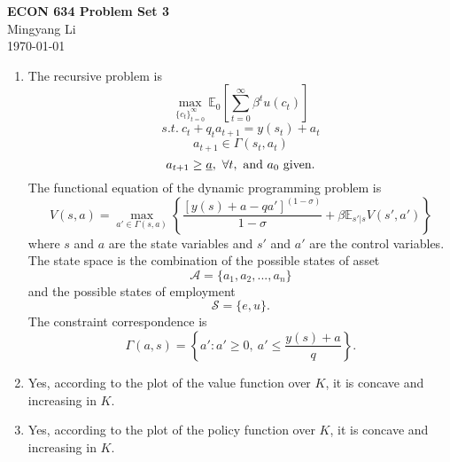 \documentclass[12pt]{article}
\begin{document}
\thispagestyle{empty}
\begin{center}
\Large{\textbf{ECON 634 Problem Set 3}}\\[3mm]
\large{{Mingyang Li}}\\[1mm]
\today
\end{center}

\begin{enumerate}
\item The recursive problem is 
$$\max_{\{c_t\}_{t=0}^\infty}\mathbb{E}_0\left[\sum_{t=0}^\infty\beta^t u(c_t)\right]$$
$$s.t.\ c_t+q_ta_{t+1}=y(s_t)+a_t$$
$$a_{t+1}\in\Gamma(s_t,a_t)$$
$$a_{t+1}\geq\underbar{$a$},\ \forall t,\ \text{and}\ a_0\ \text{given.}$$
The functional equation of the dynamic programming problem is
$$V(s,a)=\max_{a'\in\Gamma(s,a)} \left\{\frac{[y(s)+a-qa']^{(1-\sigma)}}{1-\sigma}+\beta\mathbb{E}_{s'|s}V(s',a')\right\}$$
where $s$ and $a$ are the state variables and $s'$ and $a'$ are the control variables.\\
The state space is the combination of the possible states of asset $$\mathscr{A}=\{a_1,a_2,...,a_n\}$$ and the possible states of employment $$\mathscr{S}=\{e,u\}.$$
The constraint correspondence is $$\Gamma(a,s)=\left\{a':a'\geq0,\ a'\leq\frac{y(s)+a}{q}\right\}.$$
\item Yes, according to the plot of the value function over $K$, it is concave and increasing in $K$.

\item Yes, according to the plot of the policy function over $K$, it is concave and increasing in $K$.

\end{enumerate}
\end{document}
